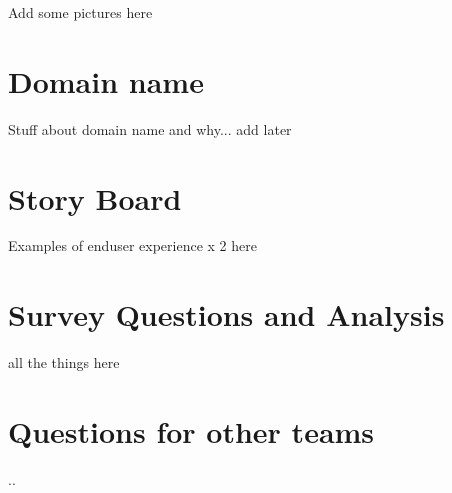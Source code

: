 \documentclass[letterpaper,12pt]{article}
\begin{document}
Add some pictures here

\section{Domain name}

Stuff about domain name and why... add later

\section{Story Board}

Examples of enduser experience x 2 here

\section{Survey Questions and Analysis}

all the things here

\section{Questions for other teams}

..

\appendix
\printindex
\printglossaries

\end{document}
